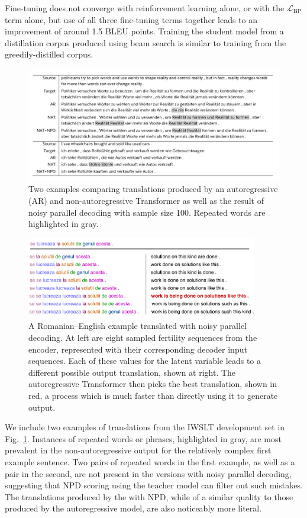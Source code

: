 \documentclass{article} %
\begin{document}
Fine-tuning does not converge with reinforcement learning alone, or with the $\mathcal{L}_\text{BP}$ term alone, but use of all three fine-tuning terms together leads to an improvement of around 1.5 BLEU points. Training the student model from a distillation corpus produced using beam search is similar to training from the greedily-distilled corpus.

\begin{figure}[htpb]
\includegraphics[width=\textwidth]{figures/examples1}
\caption{\label{fig.ex} Two examples comparing translations produced by an autoregressive (AR) and non-autoregressive Transformer as well as the result of noisy parallel decoding with sample size 100. Repeated words are highlighted in gray.}
\end{figure}
\begin{figure}[htpb]
\centering
\includegraphics[width=0.9\textwidth]{figures/fertility_example2}
\caption{\label{fig.fer} A Romanian--English example translated with noisy parallel decoding. At left are eight sampled fertility sequences from the encoder, represented with their corresponding decoder input sequences. Each of these values for the latent variable leads to a different possible output translation, shown at right. The autoregressive Transformer then picks the best translation, shown in red, a process which is much faster than directly using it to generate output.}
\end{figure}

We include two examples of translations from the IWSLT development set in Fig.~\ref{fig.ex}.
Instances of repeated words or phrases, highlighted in gray, are most prevalent in the non-autoregressive output for the relatively complex first example sentence. Two pairs of repeated words in the first example, as well as a pair in the second, are not present in the versions with noisy parallel decoding, suggesting that NPD scoring using the teacher model can filter out such mistakes. The translations produced by the \model{} with NPD, while of a similar quality to those produced by the autoregressive model, are also noticeably more literal. 
\end{document}
